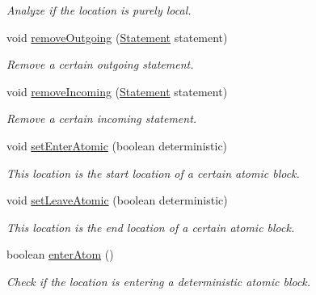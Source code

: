 \begin{DoxyCompactItemize}
\begin{DoxyCompactList}\small\item\em Analyze if the location is purely local. \end{DoxyCompactList}\item 
void \hyperlink{interfaceedu_1_1udel_1_1cis_1_1vsl_1_1civl_1_1model_1_1IF_1_1location_1_1Location_a0930ea35b349bebb4ba62db154cc370b}{remove\+Outgoing} (\hyperlink{interfaceedu_1_1udel_1_1cis_1_1vsl_1_1civl_1_1model_1_1IF_1_1statement_1_1Statement}{Statement} statement)
\begin{DoxyCompactList}\small\item\em Remove a certain outgoing statement. \end{DoxyCompactList}\item 
void \hyperlink{interfaceedu_1_1udel_1_1cis_1_1vsl_1_1civl_1_1model_1_1IF_1_1location_1_1Location_a8aad70555be8392bc7e25745fd2d1c58}{remove\+Incoming} (\hyperlink{interfaceedu_1_1udel_1_1cis_1_1vsl_1_1civl_1_1model_1_1IF_1_1statement_1_1Statement}{Statement} statement)
\begin{DoxyCompactList}\small\item\em Remove a certain incoming statement. \end{DoxyCompactList}\item 
void \hyperlink{interfaceedu_1_1udel_1_1cis_1_1vsl_1_1civl_1_1model_1_1IF_1_1location_1_1Location_a0a8ec63fe48199bfd39f86b71585870f}{set\+Enter\+Atomic} (boolean deterministic)
\begin{DoxyCompactList}\small\item\em This location is the start location of a certain atomic block. \end{DoxyCompactList}\item 
void \hyperlink{interfaceedu_1_1udel_1_1cis_1_1vsl_1_1civl_1_1model_1_1IF_1_1location_1_1Location_a845a67bdcd66c936c36bc490e6f4d358}{set\+Leave\+Atomic} (boolean deterministic)
\begin{DoxyCompactList}\small\item\em This location is the end location of a certain atomic block. \end{DoxyCompactList}\item 
boolean \hyperlink{interfaceedu_1_1udel_1_1cis_1_1vsl_1_1civl_1_1model_1_1IF_1_1location_1_1Location_a96cc7c4c83d4c2da6f1b1fad63eb75f5}{enter\+Atom} ()
\begin{DoxyCompactList}\small\item\em Check if the location is entering a deterministic atomic block. \end{DoxyCompactList}\item 

\end{DoxyCompactItemize}
